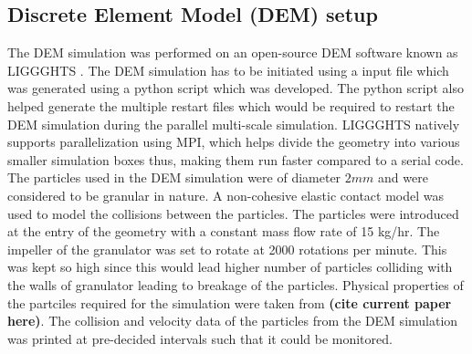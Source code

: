 \documentclass[fleqn,twoside,10pt]{article}
\begin{document}
\subsection{Discrete Element Model (DEM) setup}
The DEM simulation was performed on an open-source DEM software known as LIGGGHTS \citep{kloss2012}.
The DEM simulation has to be initiated using a input file which was generated using a python script 
which was developed. The python script also helped generate the multiple restart files which would 
be required to restart the DEM simulation during the parallel multi-scale simulation. LIGGGHTS 
natively supports parallelization using MPI, which helps divide the geometry into various smaller 
simulation boxes thus, making them run faster compared to a serial code. \\
The particles used in the DEM simulation were of diameter $2mm$ and were considered to be 
granular in nature. A non-cohesive elastic contact model was used to model the collisions between 
the particles. The particles were introduced at the entry of the geometry with a constant mass 
flow rate of 15 kg/hr. The impeller of the granulator was set to rotate at 2000 rotations per 
minute. This was kept so high since this would lead higher number of particles colliding with 
the walls of granulator leading to breakage of the particles. Physical properties of the partciles 
required for the simulation were taken from \textbf{(cite current paper here)}. The collision and 
velocity data of the particles from the DEM simulation was printed at pre-decided intervals such 
that it could be monitored.

\end{document}
